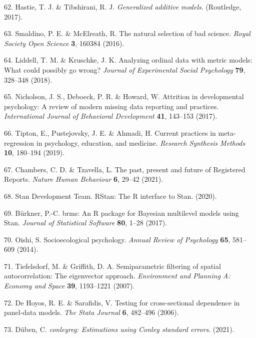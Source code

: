 \documentclass[english,man,floatsintext]{apa6}
\begin{document}
\leavevmode\hypertarget{ref-Hastie2017}{}%
62. Hastie, T. J. \& Tibshirani, R. J. \emph{Generalized additive models}. (Routledge, 2017).

\leavevmode\hypertarget{ref-Smaldino2016}{}%
63. Smaldino, P. E. \& McElreath, R. The natural selection of bad science. \emph{Royal Society Open Science} \textbf{3}, 160384 (2016).

\leavevmode\hypertarget{ref-Liddell2018}{}%
64. Liddell, T. M. \& Kruschke, J. K. Analyzing ordinal data with metric models: What could possibly go wrong? \emph{Journal of Experimental Social Psychology} \textbf{79}, 328--348 (2018).

\leavevmode\hypertarget{ref-Nicholson2017}{}%
65. Nicholson, J. S., Deboeck, P. R. \& Howard, W. Attrition in developmental psychology: A review of modern missing data reporting and practices. \emph{International Journal of Behavioral Development} \textbf{41}, 143--153 (2017).

\leavevmode\hypertarget{ref-Tipton2019}{}%
66. Tipton, E., Pustejovsky, J. E. \& Ahmadi, H. Current practices in meta-regression in psychology, education, and medicine. \emph{Research Synthesis Methods} \textbf{10}, 180--194 (2019).

\leavevmode\hypertarget{ref-Chambers2021}{}%
67. Chambers, C. D. \& Tzavella, L. The past, present and future of Registered Reports. \emph{Nature Human Behaviour} \textbf{6}, 29--42 (2021).

\leavevmode\hypertarget{ref-rstan}{}%
68. Stan Development Team. RStan: The R interface to Stan. (2020).

\leavevmode\hypertarget{ref-Burkner2017}{}%
69. Bürkner, P.-C. brms: An R package for Bayesian multilevel models using Stan. \emph{Journal of Statistical Software} \textbf{80}, 1--28 (2017).

\leavevmode\hypertarget{ref-Oishi2013}{}%
70. Oishi, S. Socioecological psychology. \emph{Annual Review of Psychology} \textbf{65}, 581--609 (2014).

\leavevmode\hypertarget{ref-Tiefelsdorf2007}{}%
71. Tiefelsdorf, M. \& Griffith, D. A. Semiparametric filtering of spatial autocorrelation: The eigenvector approach. \emph{Environment and Planning A: Economy and Space} \textbf{39}, 1193--1221 (2007).

\leavevmode\hypertarget{ref-DeHoyos2006}{}%
72. De Hoyos, R. E. \& Sarafidis, V. Testing for cross-sectional dependence in panel-data models. \emph{The Stata Journal} \textbf{6}, 482--496 (2006).

\leavevmode\hypertarget{ref-Duben2021}{}%
73. Düben, C. \emph{conleyreg: Estimations using Conley standard errors}. (2021).
\end{document}
